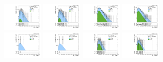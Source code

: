 \begin{figure}[htbp]
  \includegraphics[width=0.18\textwidth]{fig/fitValidation/PostFit_SR_MVV_MJJ150to210__mu_HP_nobb_HDy_Run2.pdf}
  \includegraphics[width=0.18\textwidth]{fig/fitValidation/PostFit_SR_MVV_MJJ150to210__e_HP_nobb_HDy_Run2.pdf}
  \includegraphics[width=0.18\textwidth]{fig/fitValidation/PostFit_SR_MVV_MJJ150to210__mu_LP_nobb_HDy_Run2.pdf}
  \includegraphics[width=0.18\textwidth]{fig/fitValidation/PostFit_SR_MVV_MJJ150to210__e_LP_nobb_HDy_Run2.pdf}\\
  \includegraphics[width=0.18\textwidth]{fig/fitValidation/PostFit_SR_MVV_MJJ150to210__mu_HP_vbf_HDy_Run2.pdf}
  \includegraphics[width=0.18\textwidth]{fig/fitValidation/PostFit_SR_MVV_MJJ150to210__e_HP_vbf_HDy_Run2.pdf}
  \includegraphics[width=0.18\textwidth]{fig/fitValidation/PostFit_SR_MVV_MJJ150to210__mu_LP_vbf_HDy_Run2.pdf}
  \includegraphics[width=0.18\textwidth]{fig/fitValidation/PostFit_SR_MVV_MJJ150to210__e_LP_vbf_HDy_Run2.pdf}\\
  \caption{
  }
  \label{fig:postfit_MVV_MJJ150to210_Run2}
\end{figure}

